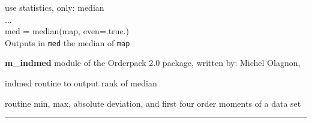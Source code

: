\begin{example}
{
use statistics, only: median \\
... \\
med = median(map, even=.true.)  \\
}
{
Outputs in {\tt med} the median of {\tt map}
}
\end{example}

\begin{modules}
  \begin{sulist}{} %
  \item[\textbf{m\_indmed}] module of the Orderpack 2.0 package, written by:
  Michel Olagnon,  
  \item[indmed] routine to output rank of median
  \end{sulist}
\end{modules}

\begin{related}
  \begin{sulist}{} %
  \item[\htmlref{compute\_statistics}{sub:compute_statistics}] routine min, max,
  absolute deviation, and first four order moments of a data set
  \end{sulist}
\end{related}

\rule{\hsize}{2mm}

\newpage
